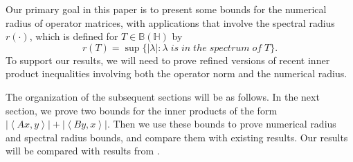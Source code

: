 \documentclass[12pt,twoside,reqno]{amsart}
\numberwithin{equation}{section}
\begin{document}
Our primary goal in this paper is to present some bounds for the numerical radius of operator matrices, with applications that involve the spectral radius $r(\cdot)$, which is defined for $T\in\mathbb{B}(\mathbb{H})$ by 
\[r(T)=\sup\{|\lambda|:\lambda\;is\;in\;the\;spectrum\;of\;T\}.\]
To support our results, we will need to prove refined versions of recent inner product inequalities involving both the operator norm and the numerical radius. 

The organization of the subsequent sections will be as follows. In the next section, we prove two bounds for the inner products of the form $\left| \left\langle Ax,y \right\rangle  \right|+\left| \left\langle By,x \right\rangle  \right|$. Then we use these bounds to prove numerical radius and spectral radius bounds, and compare them with existing results. Our results will be compared with results from \cite{Abu-Omar_LAA_2015,2,Hirzallah_IEOT_2011,Hou_IEOT_1995,Kittaneh_Studia_2003,Shebrawi_LAA_2017}.
\end{document}
